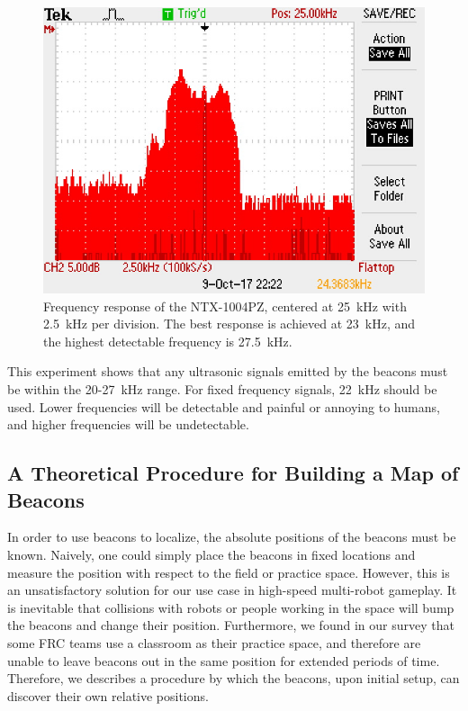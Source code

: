 \documentclass{article}
\begin{document}
    \begin{figure}[H]
      \centering
      \includegraphics[width=0.7\linewidth]{./images/frequency_response.JPG}
      \caption{Frequency response of the NTX-1004PZ, centered at \SI{25}{\kilo\hertz} with \SI{2.5}{\kilo\hertz} per division. The best response is achieved at \SI{23}{\kilo\hertz}, and the highest detectable frequency is \SI{27.5}{\kilo\hertz}.}
      \label{fig:frequency_response}
    \end{figure}

    This experiment shows that any ultrasonic signals emitted by the beacons must be within the 20-27\SI{}{\kilo\hertz} range. For fixed frequency signals, \SI{22}{\kilo\hertz} should be used. Lower frequencies will be detectable and painful or annoying to humans, and higher frequencies will be undetectable.

  \subsection{A Theoretical Procedure for Building a Map of Beacons} \label{section:beacon_self_localization}

    In order to use beacons to localize, the absolute positions of the beacons must be known. Naively, one could simply place the beacons in fixed locations and measure the position with respect to the field or practice space. However, this is an unsatisfactory solution for our use case in high-speed multi-robot gameplay. It is inevitable that collisions with robots or people working in the space will bump the beacons and change their position. Furthermore, we found in our survey that some FRC teams use a classroom as their practice space, and therefore are unable to leave beacons out in the same position for extended periods of time. Therefore, we describes a procedure by which the beacons, upon initial setup, can discover their own relative positions.
\end{document}
